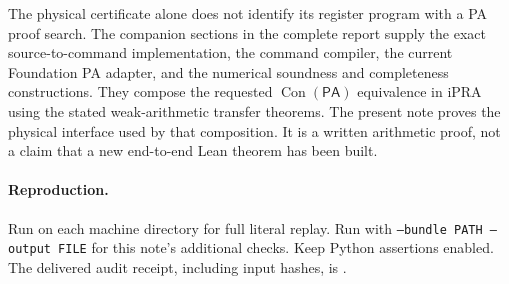 \documentclass[11pt]{article}
\begin{document}
The physical certificate alone does not identify its register program
with a PA proof search. The companion sections in the complete report
supply the exact source-to-command implementation, the command compiler,
the current Foundation PA adapter, and the numerical soundness and
completeness constructions. They compose the requested
$\operatorname{Con}(\mathsf{PA})$ equivalence in iPRA using the stated
weak-arithmetic transfer theorems. The present note proves the physical
interface used by that composition. It is a written arithmetic proof,
not a claim that a new end-to-end Lean theorem has been built.

\paragraph{Reproduction.}
Run  on each machine directory for
full literal replay. Run 
with \texttt{--bundle PATH --output FILE} for this note's additional
checks. Keep Python assertions enabled. The delivered audit receipt,
including input hashes, is
.
\end{document}
